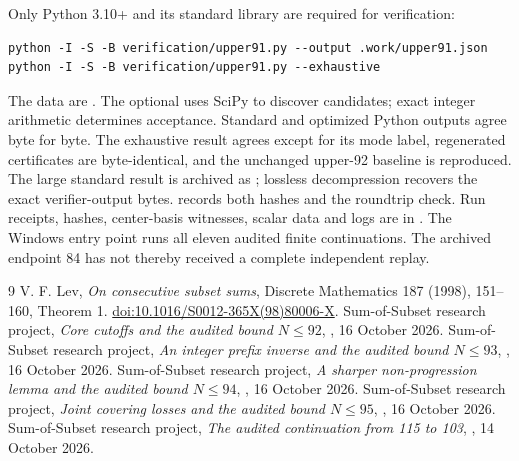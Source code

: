 \documentclass[11pt,a4paper]{article}
\begin{document}
Only Python 3.10+ and its standard library are required for verification:
\begin{verbatim}
python -I -S -B verification/upper91.py --output .work/upper91.json
python -I -S -B verification/upper91.py --exhaustive
\end{verbatim}
The data are . The optional
 uses SciPy to
discover candidates; exact integer arithmetic determines acceptance.
Standard and optimized Python outputs agree byte for byte. The exhaustive
result agrees except for its mode label, regenerated certificates are
byte-identical, and the unchanged upper-92 baseline is reproduced.
The large standard result is archived as ;
lossless decompression recovers the exact verifier-output bytes.
 records both hashes and the roundtrip check.
Run receipts, hashes, center-basis witnesses, scalar data and logs are in
. The Windows entry point runs all eleven
audited finite continuations. The archived endpoint 84 has not thereby
received a complete independent replay.

\begin{thebibliography}{9}
 V. F. Lev, \emph{On consecutive subset sums},
Discrete Mathematics 187 (1998), 151--160, Theorem 1.
\href{https://doi.org/10.1016/S0012-365X(98)80006-X}{doi:10.1016/S0012-365X(98)80006-X}.
 Sum-of-Subset research project,
\emph{Core cutoffs and the audited bound $N\le92$},
, 16 October 2026.
 Sum-of-Subset research project,
\emph{An integer prefix inverse and the audited bound $N\le93$},
, 16 October 2026.
 Sum-of-Subset research project,
\emph{A sharper non-progression lemma and the audited bound $N\le94$},
, 16 October 2026.
 Sum-of-Subset research project,
\emph{Joint covering losses and the audited bound $N\le95$},
, 16 October 2026.
 Sum-of-Subset research project,
\emph{The audited continuation from 115 to 103},
, 14 October 2026.
\end{thebibliography}
\end{document}
